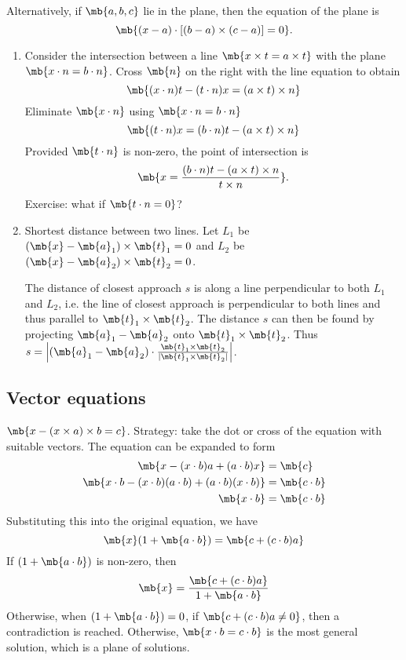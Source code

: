 \documentclass[a4paper]{article}
\begin{document}
Alternatively, if $\mb{a, b, c}$ lie in the plane, then the equation of the plane is
\[
\mb{(x - a)\cdot [(b - a)\times (c - a)] = 0}.
\]

\begin{eg}\leavevmode
  \begin{enumerate}
  \item Consider the intersection between a line $\mb{x\times t = a\times t}$ with the plane $\mb{x\cdot n = b\cdot n}$. Cross $\mb{n}$ on the right with the line equation to obtain
    \[
    \mb{(x\cdot n)t - (t\cdot n)x = (a\times t)\times n}
    \]
    Eliminate $\mb{x\cdot n}$ using $\mb{x\cdot n = b\cdot n}$
    \[
    \mb{(t\cdot n)x = (b\cdot n)t - (a\times t)\times n}
    \]
    Provided $\mb{t\cdot n}$ is non-zero, the point of intersection is
    \[
    \mb{x = \frac{(b\cdot n)t - (a\times t)\times n}{t\times n}}.
    \]
    Exercise: what if $\mb{t\cdot n = 0}$?
  \item Shortest distance between two lines. Let $L_1$ be $(\mb{x} - \mb{a}_1)\times \mb{t}_1 = 0$ and $L_2$ be $(\mb{x} - \mb{a}_2)\times \mb{t}_2 = 0$.

    The distance of closest approach $s$ is along a line perpendicular to both $L_1$ and $L_2$, i.e. the line of closest approach is perpendicular to both lines and thus parallel to $\mb{t}_1\times \mb{t}_2$. The distance $s$ can then be found by projecting $\mb{a}_1 - \mb{a}_2$ onto $\mb{t}_1\times \mb{t}_2$. Thus $s = \left|(\mb{a}_1 - \mb{a}_2)\cdot\frac{\mb{t}_1\times \mb{t}_2}{|\mb{t}_1\times \mb{t}_2|}\right|$.
  \end{enumerate}
\end{eg}
\subsection{Vector equations}
\begin{eg}
  $\mb{x - (x\times a)\times b = c}$. Strategy: take the dot or cross of the equation with suitable vectors. The equation can be expanded to form
  \begin{align*}
    \mb{x - (x\cdot b)a + (a\cdot b)x} &= \mb{c}\\
    \mb{x\cdot b - (x\cdot b)(a\cdot b) + (a\cdot b)(x\cdot b)} &= \mb{c\cdot b}\\
    \mb{x\cdot b} &= \mb{c\cdot b}
  \end{align*}
  Substituting this into the original equation, we have
  \[
  \mb{x}(1 + \mb{a\cdot b}) = \mb{c + (c\cdot b)a}
  \]
  If $(1 + \mb{a \cdot b})$ is non-zero, then
  \[
  \mb{x} = \frac{\mb{c + (c\cdot b)a}}{1 + \mb{a\cdot b}}
  \]
  Otherwise, when $(1 + \mb{a\cdot b}) = 0$, if $\mb{c + (c\cdot b)a \not= 0}$, then a contradiction is reached. Otherwise, $\mb{x\cdot b = c\cdot b}$ is the most general solution, which is a plane of solutions.
\end{eg}
\end{document}
